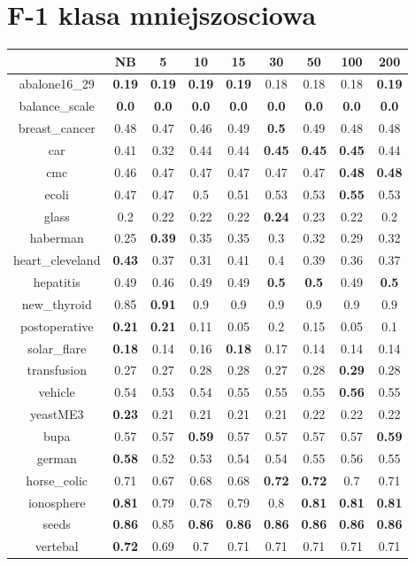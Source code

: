 \documentclass{article}%
\begin{document}
%
\section*{F{-}1 klasa mniejszosciowa}%
\begin{tabular}{c|cccccccc}%
\hline%
&NB&5&10&15&30&50&100&200\\%
\hline%
abalone16\_29&\textbf{0.19}&\textbf{0.19}&\textbf{0.19}&\textbf{0.19}&0.18&0.18&0.18&\textbf{0.19}\\%
\hline%
balance\_scale&\textbf{0.0}&\textbf{0.0}&\textbf{0.0}&\textbf{0.0}&\textbf{0.0}&\textbf{0.0}&\textbf{0.0}&\textbf{0.0}\\%
\hline%
breast\_cancer&0.48&0.47&0.46&0.49&\textbf{0.5}&0.49&0.48&0.48\\%
\hline%
car&0.41&0.32&0.44&0.44&\textbf{0.45}&\textbf{0.45}&\textbf{0.45}&0.44\\%
\hline%
cmc&0.46&0.47&0.47&0.47&0.47&0.47&\textbf{0.48}&\textbf{0.48}\\%
\hline%
ecoli&0.47&0.47&0.5&0.51&0.53&0.53&\textbf{0.55}&0.53\\%
\hline%
glass&0.2&0.22&0.22&0.22&\textbf{0.24}&0.23&0.22&0.2\\%
\hline%
haberman&0.25&\textbf{0.39}&0.35&0.35&0.3&0.32&0.29&0.32\\%
\hline%
heart\_cleveland&\textbf{0.43}&0.37&0.31&0.41&0.4&0.39&0.36&0.37\\%
\hline%
hepatitis&0.49&0.46&0.49&0.49&\textbf{0.5}&\textbf{0.5}&0.49&\textbf{0.5}\\%
\hline%
new\_thyroid&0.85&\textbf{0.91}&0.9&0.9&0.9&0.9&0.9&0.9\\%
\hline%
postoperative&\textbf{0.21}&\textbf{0.21}&0.11&0.05&0.2&0.15&0.05&0.1\\%
\hline%
solar\_flare&\textbf{0.18}&0.14&0.16&\textbf{0.18}&0.17&0.14&0.14&0.14\\%
\hline%
transfusion&0.27&0.27&0.28&0.28&0.27&0.28&\textbf{0.29}&0.28\\%
\hline%
vehicle&0.54&0.53&0.54&0.55&0.55&0.55&\textbf{0.56}&0.55\\%
\hline%
yeastME3&\textbf{0.23}&0.21&0.21&0.21&0.21&0.22&0.22&0.22\\%
\hline%
bupa&0.57&0.57&\textbf{0.59}&0.57&0.57&0.57&0.57&\textbf{0.59}\\%
\hline%
german&\textbf{0.58}&0.52&0.53&0.54&0.54&0.55&0.56&0.55\\%
\hline%
horse\_colic&0.71&0.67&0.68&0.68&\textbf{0.72}&\textbf{0.72}&0.7&0.71\\%
\hline%
ionosphere&\textbf{0.81}&0.79&0.78&0.79&0.8&\textbf{0.81}&\textbf{0.81}&\textbf{0.81}\\%
\hline%
seeds&\textbf{0.86}&0.85&\textbf{0.86}&\textbf{0.86}&\textbf{0.86}&\textbf{0.86}&\textbf{0.86}&\textbf{0.86}\\%
\hline%
vertebal&\textbf{0.72}&0.69&0.7&0.71&0.71&0.71&0.71&0.71\\%
\hline%
\end{tabular}
\end{document}
